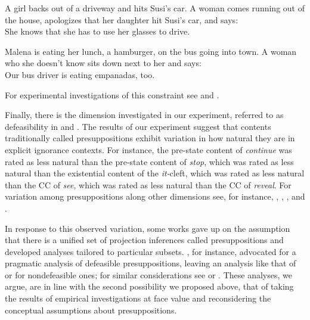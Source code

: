 \documentclass[11pt,fleqn]{article}
\def\infelic{{\leavevmode\llap{\#}}}
\newcommand{\6}{\mbox{$[\hspace*{-.6mm}[$}}
\newcommand{\9}{\mbox{$]\hspace*{-.6mm}]$}}
\begin{document}
\begin{exe}
\ex\label{scf} \citealt[78, 80]{brst-lang11}
\begin{xlist}
\ex A girl backs out of a driveway and hits Susi's car. A woman comes running out of the house, apologizes that her daughter hit Susi's car, and says: \\ She knows that she has to use her glasses to drive.

\ex Malena is eating her lunch, a hamburger, on the bus going into town. A woman who she doesn't know sits down next to her and says:
\\ \infelic Our bus driver is eating empanadas, too.

\end{xlist}
\end{exe}
For experimental investigations of this constraint see \citealt{wilcox-etal2021} and \citealt{solstad-bott2024}.

Finally, there is the dimension investigated in our experiment, referred to as defeasibility in \citealt{simons01} and \citealt{abusch10}. The results of our experiment suggest that contents traditionally called presuppositions exhibit variation in how natural they are in explicit ignorance contexts. For instance,  the pre-state content of {\em continue} was rated as less natural than the pre-state content of {\em stop}, which was rated as less natural than the existential content of the {\em it-}cleft, which was rated as less natural than the CC of {\em see}, which was rated as less natural than the CC of {\em reveal}. For variation among presuppositions along other dimensions see, for instance, \citealt{sudo-thesis}, \citealt{bade2016-thesis}, \citealt{djaerv2019-thesis}, and \citealt{goebel2020-thesis}.

In response to this observed variation, some works gave up on the assumption that there is a unified set of projection inferences called presuppositions and developed analyses tailored to particular subsets. \citealt{abusch10}, for instance, advocated for a pragmatic analysis of defeasible presuppositions, leaving an analysis like that of \citealt{heim83} or \citealt{vds92} for nondefeasible ones; for similar considerations see \citealt{abrusan2011,romoli2015} or \citealt{roberts-simons2024}. These analyses, we argue, are in line with the second possibility we proposed above, that of taking the results of empirical investigations at face value and reconsidering the conceptual assumptions about presuppositions. 
\end{document}
